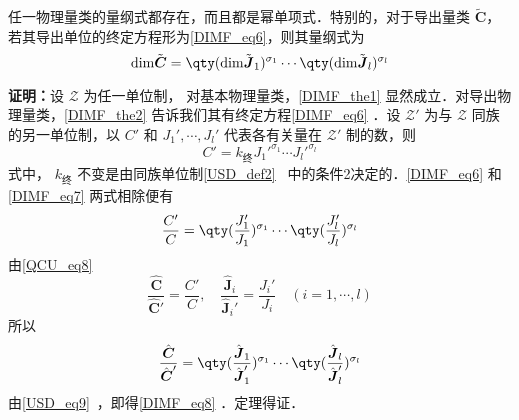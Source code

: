 \begin{theorem}{}\label{DIMF_the1}
任一物理量类的量纲式都存在，而且都是幂单项式．特别的，对于导出量类 $\tilde{\boldsymbol{C}}$，若其导出单位的终定方程形为\autoref{DIMF_eq6}，则其量纲式为
\begin{equation}\label{DIMF_eq8}
\mathrm{dim}\tilde{\boldsymbol{C}}=\qty(\mathrm{dim}\tilde{\boldsymbol{J}}_1)^{\sigma_1}\cdots\qty(\mathrm{dim}\tilde{\boldsymbol{J}}_l)^{\sigma_l}
\end{equation}
\end{theorem}
\textbf{证明：}设 $\mathscr{Z}$ 为任一单位制， 对基本物理量类，\autoref{DIMF_the1} 显然成立．对导出物理量类，\autoref{DIMF_the2} 告诉我们其有终定方程\autoref{DIMF_eq6} ．设 $\mathscr{Z'}$ 为与 $\mathscr{Z}$ 同族的另一单位制，以 $C'$ 和 $J_1',\cdots,J_l'$ 代表各有关量在 $\mathscr{Z'}$ 制的数，则
\begin{equation}\label{DIMF_eq7}
C'=k_{\text{终}}J_1'^{\sigma_1}\cdots J_l'^{\sigma_l}
\end{equation}
 式中， $k_{\text{终}}$ 不变是由同族单位制\autoref{USD_def2}~ 中的条件2决定的．\autoref{DIMF_eq6} 和\autoref{DIMF_eq7} 两式相除便有
 \begin{equation}
 \frac{C'}{C}=\qty(\frac{J_1'}{J_1})^{\sigma_1}\cdots\qty(\frac{J_l'}{J_l})^{\sigma_l}
 \end{equation}
 由\autoref{QCU_eq8}~
 \begin{equation}
 \frac{\hat{\boldsymbol{C}}}{\hat{\boldsymbol{C}}'}=\frac{C'}{C}, \quad\frac{\hat{\boldsymbol{J}}_i}{\hat{\boldsymbol{J}}_i'}=\frac{J_i'}{J_i}\quad (i=1,\cdots ,l)
 \end{equation}
 所以
 \begin{equation}
 \frac{\hat{\boldsymbol{C}}}{\hat{\boldsymbol{C}}'}=\qty(\frac{\hat{\boldsymbol{J}}_1}{\hat{\boldsymbol{J}}_1'})^{\sigma_1}\cdots\qty(\frac{\hat{\boldsymbol{J}}_l}{\hat{\boldsymbol{J}}_l'})^{\sigma_l}
 \end{equation}
 由\autoref{USD_eq9}~，即得\autoref{DIMF_eq8} ．定理得证．